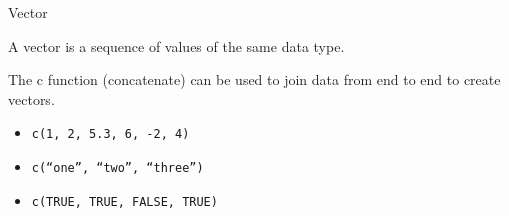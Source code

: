 \begin{frame}[fragile]{Vector}
\protect\hypertarget{vector}{}

A vector is a sequence of values of the same data type.

The c function (concatenate) can be used to join data from end to end to
create vectors.

\begin{itemize}
\tightlist
\item
  \texttt{c(1,\ 2,\ 5.3,\ 6,\ -2,\ 4)}
\item
  \texttt{c(“one”,\ “two”,\ “three”)}
\item
  \texttt{c(TRUE,\ TRUE,\ FALSE,\ TRUE)}
\end{itemize}

\end{frame}

